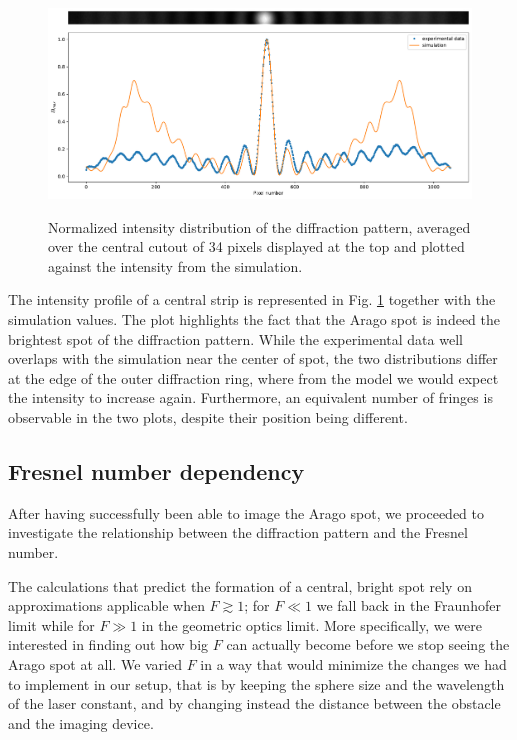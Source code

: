 \documentclass[11pt,a4paper]{article}
\begin{document}
\begin{figure}[h]
    \centering
    \includegraphics[width=\linewidth]{1 - Arago Spot/Images/Intensity-profile.pdf}
    \label{fig:Intensity profile}
    \caption{Normalized intensity distribution of the diffraction pattern, averaged over the central cutout of 34 pixels displayed at the top and plotted against the intensity from the simulation.}
    \label{fig:Arago-Spot and Intensity profile}
\end{figure}

The intensity profile of a central strip is represented in Fig. \ref{fig:Arago-Spot and Intensity profile} together with the simulation values. The plot highlights the fact that the Arago spot is indeed the brightest spot of the diffraction pattern. While the experimental data well overlaps with the simulation near the center of spot, the two distributions differ at the edge of the outer diffraction ring, where from the model we would expect the intensity to increase again. Furthermore, an equivalent number of fringes is observable in the two plots, despite their position being different.


\subsection{Fresnel number dependency}
After having successfully been able to image the Arago spot, we proceeded to investigate the relationship between the diffraction pattern and the Fresnel number. 

The calculations that predict the formation of a central, bright spot rely on approximations applicable when $F \gtrsim 1$; for $F \ll 1$ we fall back in the Fraunhofer limit while for $F \gg 1$ in the geometric optics limit.
More specifically, we were interested in finding out how big $F$ can actually become before we stop seeing the Arago spot at all. We varied $F$ in a way that would minimize the changes we had to implement in our setup, that is by keeping the sphere size and the wavelength of the laser constant, and by changing instead the distance between the obstacle and the imaging device. 
\end{document}
